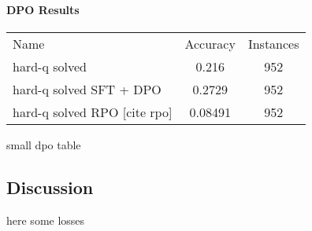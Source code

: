 \documentclass[a4paper,10pt]{article}
\begin{document}
\paragraph{DPO Results}

\begin{center}
 \begin{tabular}{lcc}
 Name & Accuracy & Instances \\
 hard-q solved & 0.216 & 952 \\
 hard-q solved SFT + DPO & 0.2729 & 952 \\
 hard-q solved RPO [cite rpo] & 0.08491 & 952 \\
 
 \end{tabular}
\end{center}


small dpo table
\subsection{Discussion}
here some losses
\end{document}
